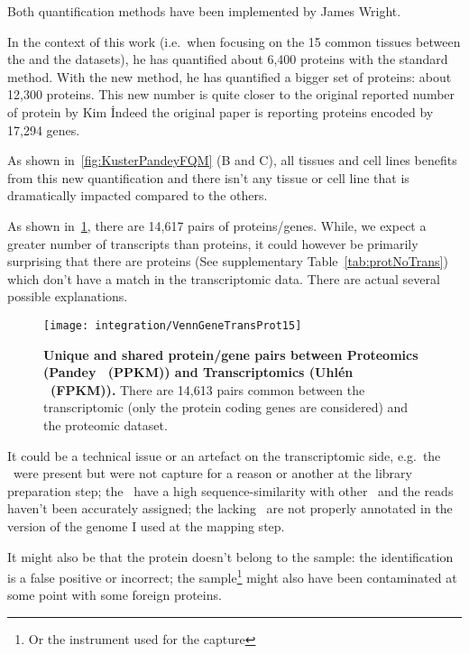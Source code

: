 Both quantification methods have been implemented by James Wright.

In the context of this work (i.e.\ when focusing on the 15 common tissues between
the  and the  datasets),
he has quantified about 6,400 proteins with
the standard method. With the new method, he has quantified a bigger set of
proteins: about 12,300 proteins. This new number is quite closer to the original
reported number of protein by Kim \etal\.  Indeed the original paper is
reporting proteins encoded by 17,294 genes.

As shown in~\cref{fig:KusterPandeyFQM} (B and C),
all tissues and cell lines benefits from this new quantification and there isn't
any tissue or cell line that is dramatically impacted compared to the others.

As shown in~\cref{fig:VennGeneTransProt15}, there are 14,617 pairs of
proteins/genes. While, we expect a greater number of transcripts than proteins,
it could however be primarily surprising that there are proteins
(See supplementary Table~\cref{tab:protNoTrans}) which don't have
a match in the transcriptomic data. There are actual several possible explanations.

\begin{figure}[!htbp]
    \texttt{[image: integration/VennGeneTransProt15]}\centering
    \caption[Unique and shared protein/gene pairs between Proteomics
    (Pandey \etal\ (PPKM)) and
    Transcriptomics (Uhlén \etal\ (\gls{FPKM}))]
    {\label{fig:VennGeneTransProt15}\textbf{Unique and shared protein/gene
    pairs between Proteomics (Pandey \etal\ (PPKM)) and Transcriptomics (Uhlén
    \etal\  (\gls{FPKM})).} There are 14,613 pairs common between the
    transcriptomic (only the protein coding genes are considered)
    and the proteomic dataset.}
\end{figure}

It could be a technical issue or an artefact on the transcriptomic side, e.g.\
the \mRNAs\ were present but were not capture for a reason or another at the
library preparation step; the \mRNAs\ have a high sequence-similarity with other
\mRNAs\ and the reads haven't been accurately assigned; the lacking \mRNAs\ are
not properly annotated in the version of the genome I used at the mapping step.

It might also be that the protein doesn't belong to the sample: the identification
is a false positive or incorrect; the sample\footnote{Or the instrument used for
the capture} might also have been contaminated at some point with some foreign
proteins.


